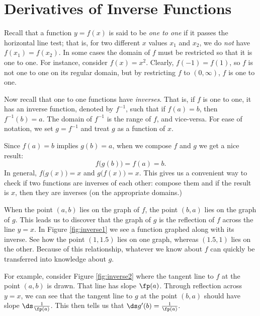 \section{Derivatives of Inverse Functions}\label{sec:deriv_inverse_function}

Recall that a function $y=f(x)$ is said to be \textit{one to one} if it passes the horizontal line test; that is, for two different $x$ values $x_1$ and $x_2$, we do \textit{not} have $f(x_1)=f(x_2)$. In some cases the domain of $f$ must be restricted so that it is one to one. For instance, consider $f(x)=x^2$. Clearly, $f(-1)= f(1)$, so $f$ is not one to one on its regular domain, but by restricting $f$ to $(0,\infty)$, $f$ is one to one.

Now recall that one to one functions have \textit{inverses}. That is, if $f$ is one to one, it has an inverse function, denoted by $f^{-1}$, such that if $f(a)=b$, then $f^{-1}(b) = a$. The domain of $f^{-1}$ is the range of $f$, and vice-versa. For ease of notation, we set $g=f^{-1}$ and treat $g$ as a function of $x$.

Since $f(a)=b$ implies $g(b)=a$, when we compose $f$ and $g$ we get a nice result: $$f\big(g(b)\big) = f(a) = b.$$ In general, $f\big(g(x)\big) =x$ and $g\big(f(x)\big) = x$. This gives us a convenient way to check if two functions are inverses of each other: compose them and if the result is $x$, then they are inverses (on the appropriate domains.)

When the point $(a,b)$ lies on the graph of $f$, the point $(b,a)$ lies on the graph of $g$. This leads us to discover that the graph of $g$ is the reflection of $f$ across the line $y=x$. In Figure \ref{fig:inverse1} we see a function graphed along with its inverse. See how the point $(1,1.5)$ lies on one graph, whereas $(1.5,1)$ lies on the other. Because of this relationship, whatever we know about $f$ can quickly be transferred into knowledge about $g$.


For example, consider Figure \ref{fig:inverse2} where the tangent line to $f$ at the point $(a,b)$ is drawn. That line has slope $\fp(a)$. Through reflection across $y=x$, we can see that the tangent line to $g$ at the point $(b,a)$ should have slope $\ds \frac{1}{\fp(a)}$. This then tells us that $\ds g'(b) = \frac{1}{\fp(a)}.$

